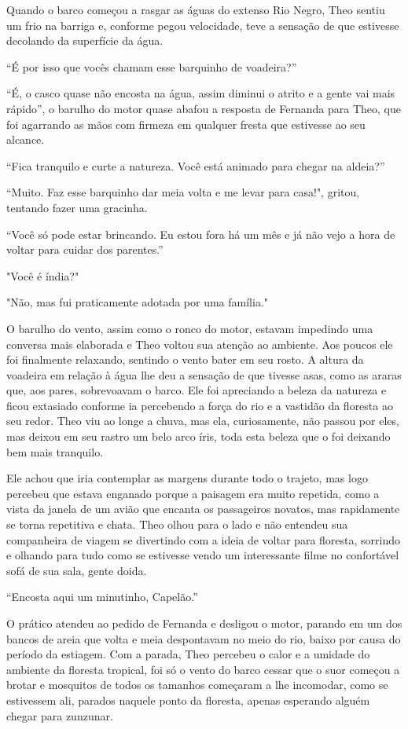 Quando o barco começou a rasgar as águas do extenso Rio Negro, Theo
sentiu um frio na barriga e, conforme pegou velocidade, teve a sensação
de que estivesse decolando da superfície da água.

``É por isso que vocês chamam esse barquinho de voadeira?''

``É, o casco quase não encosta na água, assim diminui o atrito e a gente
vai mais rápido'', o barulho do motor quase abafou a resposta de
Fernanda para Theo, que foi agarrando as mãos com firmeza em qualquer
fresta que estivesse ao seu alcance.

``Fica tranquilo e curte a natureza. Você está animado para chegar na
aldeia?''

``Muito. Faz esse barquinho dar meia volta e me levar para casa!",
gritou, tentando fazer uma gracinha.

``Você só pode estar brincando. Eu estou fora há um mês e já não vejo a
hora de voltar para cuidar dos parentes.''

"Você é índia?"

"Não, mas fui praticamente adotada por uma família."

O barulho do vento, assim como o ronco do motor, estavam impedindo uma
conversa mais elaborada e Theo voltou sua atenção ao ambiente. Aos
poucos ele foi finalmente relaxando, sentindo o vento bater em seu
rosto. A altura da voadeira em relação à água lhe deu a sensação de que
tivesse asas, como as araras que, aos pares, sobrevoavam o barco. Ele
foi apreciando a beleza da natureza e ficou extasiado conforme ia
percebendo a força do rio e a vastidão da floresta ao seu redor. Theo
viu ao longe a chuva, mas ela, curiosamente, não passou por eles, mas
deixou em seu rastro um belo arco íris, toda esta beleza que o foi
deixando bem mais tranquilo.

Ele achou que iria contemplar as margens durante todo o trajeto, mas
logo percebeu que estava enganado porque a paisagem era muito repetida,
como a vista da janela de um avião que encanta os passageiros novatos,
mas rapidamente se torna repetitiva e chata. Theo olhou para o lado e
não entendeu sua companheira de viagem se divertindo com a ideia de
voltar para floresta, sorrindo e olhando para tudo como se estivesse
vendo um interessante filme no confortável sofá de sua sala, gente
doida.

``Encosta aqui um minutinho, Capelão.''

O prático atendeu ao pedido de
Fernanda e desligou o motor, parando em um dos bancos de areia que volta
e meia despontavam no meio do rio, baixo por causa do período da
estiagem. Com a parada, Theo percebeu o calor e a umidade do ambiente da
floresta tropical, foi só o vento do barco cessar que o suor começou a
brotar e mosquitos de todos os tamanhos começaram a lhe incomodar, como
se estivessem ali, parados naquele ponto da floresta, apenas esperando
alguém chegar para zunzunar.

